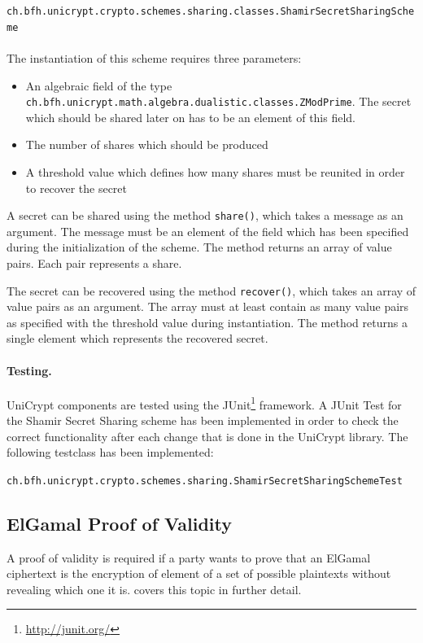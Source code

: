 \documentclass[numbers=noenddot, abstract=on, a4paper, headsepline,
footsepline, oneside, draft=off]{scrreprt}
\begin{document}
\texttt{ch.bfh.unicrypt.crypto.schemes.sharing.classes.ShamirSecretSharingScheme}
\\
\\
The instantiation of this scheme requires three parameters:
\begin{itemize}
  \item An algebraic field of the type \\
  \texttt{ch.bfh.unicrypt.math.algebra.dualistic.classes.ZModPrime}. The secret
  which should be shared later on has to be an element of this field.
  \item The number of shares which should be produced
  \item A threshold value which defines how many shares must be reunited in
  order to recover the secret
\end{itemize}

A secret can be shared using the method \texttt{share()}, which takes
a message as an argument. The message must be an element of the field which has
been specified during the initialization of the scheme. The method returns an
array of value pairs. Each pair represents a share.

The secret can be recovered using the method \texttt{recover()}, which takes an
array of value pairs as an argument. The array must at least contain as many
value pairs as specified with the threshold value during instantiation. The
method returns a single element which represents the recovered secret.

\paragraph{Testing.}
UniCrypt components are tested using the JUnit\footnote{\url{http://junit.org/}}
framework. A JUnit Test for the Shamir Secret Sharing scheme has been implemented in order to check the correct
functionality after each change that is done in the UniCrypt library. The
following testclass has been implemented:

\texttt{ch.bfh.unicrypt.crypto.schemes.sharing.ShamirSecretSharingSchemeTest}

\subsection{ElGamal Proof of Validity}
A proof of validity is required if a party wants to prove that an ElGamal
ciphertext is the encryption of element of a set of possible plaintexts without
revealing which one it is.  covers this topic in
further detail.
\end{document}
